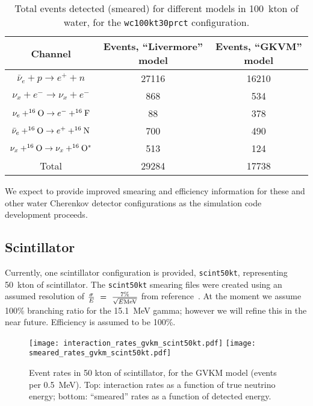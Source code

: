 \documentclass[12pt]{article}
\begin{document}
\begin{table}[h]
\centering
\begin{tabular}{|c|c|c|}
\hline
Channel & Events, ``Livermore'' model & Events, ``GKVM'' model  \\
\hline
   $\bar{\nu}_e+ p \rightarrow e^+ + n$                  &  27116 &   16210\\
$\nu_x + e^- \rightarrow \nu_x + e^-$                           & 868 &   534\\
$\nu_e + ^{16}{\rm O} \rightarrow e^- + ^{16}{\rm F}$                         & 88  &  378  \\
$\bar{\nu}_e + ^{16}{\rm O} \rightarrow e^+ + ^{16}{\rm N}$  & 700 &  490 \\


$\nu_x + ^{16}{\rm O} \rightarrow \nu_x+ ^{16}{\rm O}^*$
                         &  513 &  124 \\ \hline
Total &  29284 & 17738 \\ \hline
\end{tabular}
\caption{Total events detected (smeared) for different models in 100~kton of water, for the
\texttt{wc100kt30prct} configuration. }
\label{tab:wctable}
\end{table}

We expect to provide improved smearing and efficiency information for
these and other water Cherenkov detector configurations as the
simulation code development proceeds.

\subsection{Scintillator}

Currently, one scintillator configuration is provided,
\texttt{scint50kt}, representing 50~kton of scintillator.  The
\texttt{scint50kt} smearing files were created using an assumed
resolution of $\frac{\sigma}{E}~=~\frac{7\%}{\sqrt{E {\rm MeV}}}$
from reference~\cite{Eguchi:2002dm}.  At the moment we assume 100\% branching ratio for the 15.1~MeV gamma; however we will refine this in the near future.
Efficiency is assumed to be 100\%.


\begin{figure}[htb]
  \centering\texttt{[image: interaction\_rates\_gvkm\_scint50kt.pdf]}
  \centering\texttt{[image: smeared\_rates\_gvkm\_scint50kt.pdf]}

  \caption{Event rates in 50 kton of scintillator, for the GVKM model 
  (events per 0.5~MeV). Top: interaction rates as a
    function of true neutrino energy; bottom:  ``smeared''
    rates as a function of detected energy.}
  \label{fig:scintrates}
\end{figure}
\end{document}
